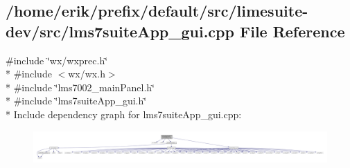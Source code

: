\subsection{/home/erik/prefix/default/src/limesuite-\/dev/src/lms7suite\+App\+\_\+gui.cpp File Reference}
\label{lms7suiteApp__gui_8cpp}
{\ttfamily \#include \char`\"{}wx/wxprec.\+h\char`\"{}}\\*
{\ttfamily \#include $<$wx/wx.\+h$>$}\\*
{\ttfamily \#include \char`\"{}lms7002\+\_\+main\+Panel.\+h\char`\"{}}\\*
{\ttfamily \#include \char`\"{}lms7suite\+App\+\_\+gui.\+h\char`\"{}}\\*
Include dependency graph for lms7suite\+App\+\_\+gui.\+cpp\+:
\nopagebreak
\begin{figure}[H]
\begin{center}
\leavevmode
\includegraphics[width=350pt]{d7/da2/lms7suiteApp__gui_8cpp__incl}
\end{center}
\end{figure}
